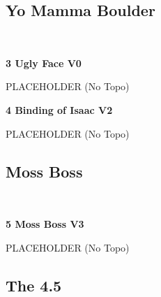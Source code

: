 \begin{multicols*}{2}
			\subsection*{Yo Mamma Boulder}\label{bf:Yo Mamma Boulder}
			\begin{minipage}{\columnwidth}
			\
			\end{minipage}
			
					\label{rt:Ugly Face}\colorbox{green!20}{\textbf{3 Ugly Face V0   \warn }}
					\begin{adjustwidth}{0.5cm}{}
					\begin{minipage}{\linewidth}					
					PLACEHOLDER
						\newline (No Topo) 
					\end{minipage}
					\end{adjustwidth}
					\label{rt:Binding of Isaac}\colorbox{green!20}{\textbf{4 Binding of Isaac V2    \warn }}
					\begin{adjustwidth}{0.5cm}{}
					\begin{minipage}{\linewidth}					
					PLACEHOLDER
						\newline (No Topo) 
					\end{minipage}
					\end{adjustwidth}
			\subsection*{Moss Boss}\label{bf:Moss Boss}
			\begin{minipage}{\columnwidth}
			\
			\end{minipage}
			
					\label{rt:Moss Boss}\colorbox{green!20}{\textbf{5 Moss Boss V3   }}
					\begin{adjustwidth}{0.5cm}{}
					\begin{minipage}{\linewidth}					
					PLACEHOLDER
						\newline (No Topo) 
					\end{minipage}
					\end{adjustwidth}
			\subsection*{The 4.5}\label{bf:The 4.5}
			\begin{minipage}{\columnwidth}
			\
			\end{minipage}
			

\end{multicols*}
